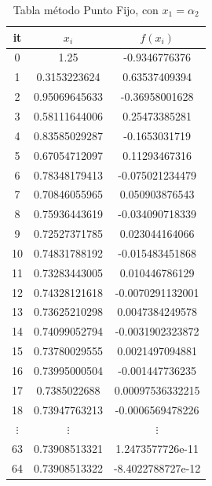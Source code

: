 \documentclass{article} %
\begin{document}
\begin{table}[H]
    \centering
    \begin{tabular}{|c|c|c|}
    \hline
it & $x_i$ & $f(x_i)$\\
\hline
0 & 1.25 & -0.9346776376\\
1 & 0.3153223624 & 0.63537409394\\
2 & 0.95069645633 & -0.36958001628\\
3 & 0.58111644006 & 0.25473385281\\
4 & 0.83585029287 & -0.1653031719\\
5 & 0.67054712097 & 0.11293467316\\
6 & 0.78348179413 & -0.075021234479\\
7 & 0.70846055965 & 0.050903876543\\
8 & 0.75936443619 & -0.034090718339\\
9 & 0.72527371785 & 0.023044164066\\
10 & 0.74831788192 & -0.015483451868\\
11 & 0.73283443005 & 0.010446786129\\
12 & 0.74328121618 & -0.0070291132001\\
13 & 0.73625210298 & 0.0047384249578\\
14 & 0.74099052794 & -0.0031902323872\\
15 & 0.73780029555 & 0.0021497094881\\
16 & 0.73995000504 & -0.001447736235\\
17 & 0.7385022688 & 0.00097536332215\\
18 & 0.73947763213 & -0.0006569478226\\
$\vdots$ & $\vdots$ & $\vdots$\\
63 & 0.73908513321 & 1.2473577726e-11\\
64 & 0.73908513322 & -8.4022788727e-12\\
\hline
\end{tabular}
    \caption{Tabla método Punto Fijo, con $x_1 = \alpha_2$}
    \label{tab4}
\end{table}
\end{document}
